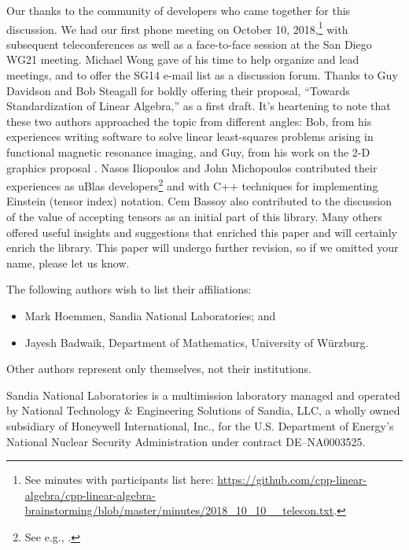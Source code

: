 Our thanks to the community of developers who came together for this
discussion.  We had our first phone meeting on October 10,
2018,\footnote{See minutes with participants list here:
  \url{https://github.com/cpp-linear-algebra/cpp-linear-algebra-brainstorming/blob/master/minutes/2018_10_10__telecon.txt}.}
with subsequent teleconferences as well as a face-to-face session at
the San Diego WG21 meeting.  Michael Wong gave of his time to help
organize and lead meetings, and to offer the SG14 e-mail list as a
discussion forum.  Thanks to Guy Davidson and Bob Steagall for boldly
offering their proposal, ``Towards Standardization of Linear
Algebra,'' as a first draft.  It's heartening to note that these two
authors approached the topic from different angles: Bob, from his
experiences writing software to solve linear least-squares problems
arising in functional magnetic resonance imaging, and Guy, from his
work on the 2-D graphics proposal \cite{P0267r8}.  Nasos Iliopoulos
and John Michopoulos contributed their experiences as uBlas
developers\footnote{See e.g., \cite{iliopoulos2011ublascl}.}  and with
C++ techniques for implementing Einstein (tensor index) notation.  Cem
Bassoy also contributed to the discussion of the value of accepting
tensors as an initial part of this library.  Many others offered
useful insights and suggestions that enriched this paper and will
certainly enrich the library.  This paper will undergo further
revision, so if we omitted your name, please let us know.

The following authors wish to list their affiliations:
\begin{itemize}
\item Mark Hoemmen, Sandia National Laboratories; and
\item Jayesh Badwaik, Department of Mathematics, University of W\"urzburg.
\end{itemize}
Other authors represent only themselves, not their institutions.

Sandia National Laboratories is a multimission laboratory managed and
operated by National Technology \& Engineering Solutions of Sandia,
LLC, a wholly owned subsidiary of Honeywell International, Inc., for
the U.S. Department of Energy's National Nuclear Security
Administration under contract DE--NA0003525.


